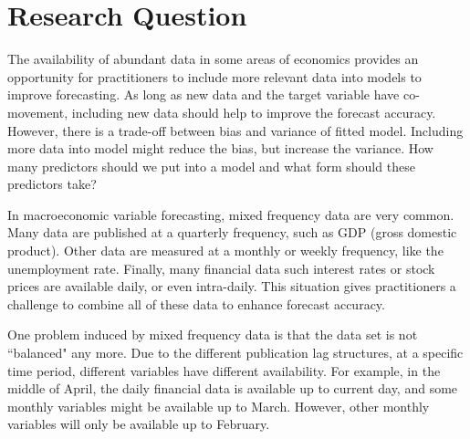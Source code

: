 \label{chapter:problem}

\newlength{\savedunitlength}
\setlength{\unitlength}{2em}




\section{Research Question}

The availability of abundant data in some areas of economics provides an opportunity for practitioners to include more relevant  data into  models to improve forecasting. As long as new data and the target variable have co-movement, including new data should help to improve the forecast accuracy. However, there is a trade-off between bias and variance of fitted model. Including more data into model might reduce the bias, but increase the variance. How many predictors should we put into a model and what form should these predictors take?


 




In macroeconomic variable forecasting, mixed frequency data are very common. Many data are published at a quarterly frequency, such as GDP (gross domestic product). Other data are measured at a monthly or weekly frequency, like the unemployment rate.  Finally, many financial data such interest rates or stock prices are available daily, or even intra-daily. This situation gives practitioners a challenge to combine all of these data to enhance forecast accuracy.






One problem induced by mixed frequency data is that the data set is not ``balanced" any more. Due to the different  publication lag structures, at a  specific time period, different variables have different availability. For example, in the middle of April, the daily financial data is available up to current day, and some monthly variables might be available up to March. However, other monthly variables will only be available up to February.  


